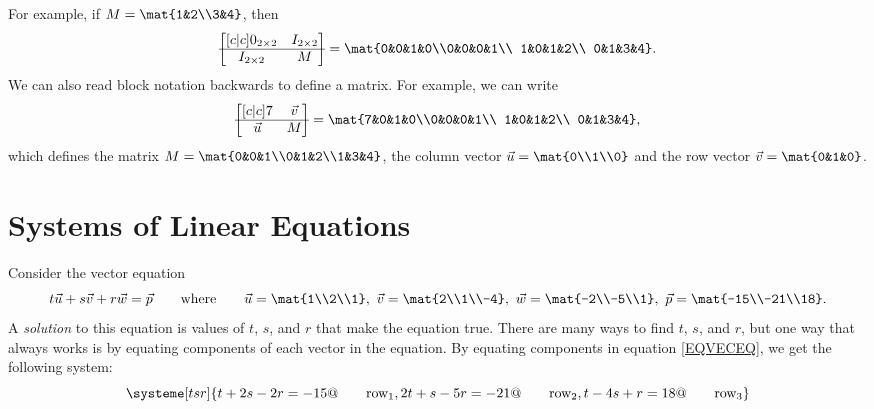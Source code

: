 	For example, if $M=\mat{1&2\\3&4}$, then
	\[
		\begin{bmatrix}[c|c]
			0_{2\times 2} & I_{2\times 2}\\
			\hline
			I_{2\times 2} & M\\
		\end{bmatrix}
		=\mat{0&0&1&0\\0&0&0&1\\
		1&0&1&2\\
		0&1&3&4}.
	\]
	We can also read block notation backwards to define a matrix. For example,
	we can write
	\[
		\begin{bmatrix}[c|c]
			7 & \vec v\\
			\hline
			\vec u & M\\
		\end{bmatrix}
		=\mat{7&0&1&0\\0&0&0&1\\
		1&0&1&2\\
		0&1&3&4},
	\]
	which defines the matrix $M=\mat{0&0&1\\0&1&2\\1&3&4}$, the column 
	vector $\vec u=\mat{0\\1\\0}$
	and the row vector $\vec v=\mat{0&1&0}$.

\section{Systems of Linear Equations}

	Consider the vector equation
	\begin{equation}\label{EQVECEQ}
		t\vec u+s\vec v+r\vec w = \vec p\qquad\text{where}\qquad \vec u=\mat{1\\2\\1},\ 
		\vec v=\mat{2\\1\\-4},\ \vec w=\mat{-2\\-5\\1},\ \vec p=\mat{-15\\-21\\18}.
	\end{equation}
	A \emph{solution} to this equation is values of $t$, $s$, and $r$ that make the equation true.
	There are many ways to find $t$, $s$, and $r$, but one way that always works is by
	equating components of each vector in the equation. By equating components in equation
	\eqref{EQVECEQ}, we get the following system:
	\begin{equation}
		\label{EQVECEQ2}
		\systeme[tsr]{
			t+2s-2r=-15@\qquad\text{row}_1,
			2t+s-5r=-21@\qquad\text{row}_2,
			t-4s+r=18@\qquad\text{row}_3
		}
	\end{equation}

